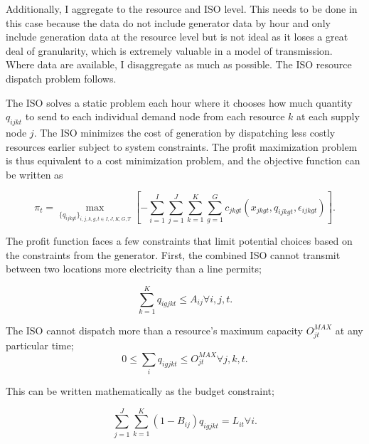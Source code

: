 \documentclass[12pt]{article}
\begin{document}
Additionally, I aggregate to the resource and ISO level. This needs to be done in this case because the data do not include generator data by hour and only include generation data at the resource level but is not ideal as it loses a great deal of granularity, which is extremely valuable in a model of transmission. Where data are available, I disaggregate as much as possible. The ISO resource dispatch problem follows.

The ISO solves a static problem each hour where it chooses how much quantity $q_{ijkt}$ to send to each individual demand node from each resource $k$ at each supply node $j$. The ISO minimizes the cost of generation by dispatching less costly resources earlier subject to system constraints. The profit maximization problem is thus equivalent to a cost minimization problem, and the objective function can be written as

\begin{equation}
\pi_{t}=\max_{\{q_{ijkgt}\}_{i,j,k,g,t\in I,J,K,G,T}} [-\sum_{i=1}^I\sum_{j=1}^J \sum_{k=1}^K \sum_{g=1}^G c_{jkgt}(x_{jkgt},q_{ijkgt},\epsilon_{ijkgt})].
\end{equation}

The profit function faces a few constraints that limit potential choices based on the constraints from the generator. First, the combined ISO cannot transmit between two locations more electricity than a line permits;
 
 \begin{equation}
    \sum_{k=1}^K q_{igjkt}\leq A_{ij} \forall i,j,t.
 \end{equation}

\noindent The ISO cannot dispatch more than a resource's maximum capacity $O_{jt}^{MAX}$ at any particular time;
  \begin{equation}
     0\leq \sum_{i} q_{igjkt}\leq O_{jt}^{MAX} \forall j,k,t.
 \end{equation}

This can be written mathematically as the budget constraint;
 
  \begin{equation}\label{Budget_Constraint}
     \sum_{j=1}^J\sum_{k=1}^K (1-B_{ij})q_{igjkt}=L_{it} \forall i.
 \end{equation}

\end{document}
